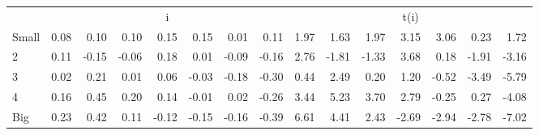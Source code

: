 \begin{table}[!ht]
\begin{tabular}{lrrrrrrrrrrrrrr}
  
     & \multicolumn{7}{c}{i} & \multicolumn{7}{c}{t(i)}   \\
     \cmidrule(r){2-8} \cmidrule(r){9-15} 
    Small  & 0.08  & 0.10  & 0.10  & 0.15  & 0.15  & 0.01  & 0.11  & 1.97  & 1.63  & 1.97  & 3.15  & 3.06  & 0.23  & 1.72   \\
    2  & 0.11  & -0.15  & -0.06  & 0.18  & 0.01  & -0.09  & -0.16  & 2.76  & -1.81  & -1.33  & 3.68  & 0.18  & -1.91  & -3.16   \\
    3  & 0.02  & 0.21  & 0.01  & 0.06  & -0.03  & -0.18  & -0.30  & 0.44  & 2.49  & 0.20  & 1.20  & -0.52  & -3.49  & -5.79   \\
    4  & 0.16  & 0.45  & 0.20  & 0.14  & -0.01  & 0.02  & -0.26  & 3.44  & 5.23  & 3.70  & 2.79  & -0.25  & 0.27  & -4.08   \\
    Big  & 0.23  & 0.42  & 0.11  & -0.12  & -0.15  & -0.16  & -0.39  & 6.61  & 4.41  & 2.43  & -2.69  & -2.94  & -2.78  & -7.02   \\
    
  
  \bottomrule
\end{tabular}
\label{tbl:25_Size_NI_F16}
\end{table}